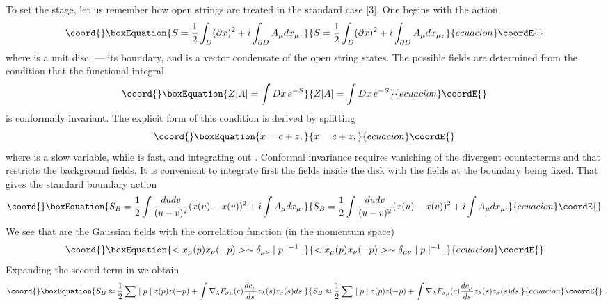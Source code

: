 \documentclass[a4paper,12pt]{article}
\begin{document}
To set the stage, let us remember how open strings are treated in the
standard case [3]. One begins with the action 
\begin{equation}\coord{}\boxEquation{
S=\frac{1}{2}\int_{D}(\partial x)^{2}+i\int_{\partial D}A_{\mu }dx_{\mu },
}{
S=\frac{1}{2}\int_{D}(\partial x)^{2}+i\int_{\partial D}A_{\mu }dx_{\mu },
}{ecuacion}\coordE{}\end{equation}
where \coordHE{} is a unit disc, \coordHE{} --- its boundary, and \coordHE{} is a
vector condensate of the open string states. The possible fields \coordHE{}
are determined from the condition that the functional integral 
\begin{equation}\coord{}\boxEquation{
Z[A]=\int Dx\,e^{-S}
}{
Z[A]=\int Dx\,e^{-S}
}{ecuacion}\coordE{}\end{equation}
is conformally invariant. The explicit form of this condition is derived by
splitting 
\begin{equation}\coord{}\boxEquation{
x=c+z,
}{
x=c+z,
}{ecuacion}\coordE{}\end{equation}
where \coordHE{} is a slow variable, while \coordHE{} is fast, and integrating out \coordHE{}.
Conformal invariance requires vanishing of the divergent counterterms and
that restricts the background fields. It is convenient to integrate first
the fields inside the disk with the fields at the boundary being fixed. That
gives the standard boundary action 
\begin{equation}\coord{}\boxEquation{
S_{B}=\frac{1}{2}\int \frac{dudv}{(u-v)^{2}}(x(u)-x(v))^{2}+i\int A_{\mu
}dx_{\mu }.
}{
S_{B}=\frac{1}{2}\int \frac{dudv}{(u-v)^{2}}(x(u)-x(v))^{2}+i\int A_{\mu
}dx_{\mu }.
}{ecuacion}\coordE{}\end{equation}
We see that \coordHE{} are the Gaussian fields with the correlation
function (in the momentum space) 
\begin{equation}\coord{}\boxEquation{
<x_{\mu }(p)x_{\nu }(-p)>\sim \delta _{\mu \nu }\mid p\mid ^{-1}.
}{
<x_{\mu }(p)x_{\nu }(-p)>\sim \delta _{\mu \nu }\mid p\mid ^{-1}.
}{ecuacion}\coordE{}\end{equation}
Expanding the second term in \coordHE{} we obtain 
\begin{equation}\coord{}\boxEquation{
S_{B}\approx \frac{1}{2}\sum \mid p\mid z(p)z(-p)+\int \nabla _{\lambda
}F_{\sigma \mu }(c)\frac{dc_{\mu }}{ds}z_{\lambda }(s)z_{\sigma }(s)ds.
}{
S_{B}\approx \frac{1}{2}\sum \mid p\mid z(p)z(-p)+\int \nabla _{\lambda
}F_{\sigma \mu }(c)\frac{dc_{\mu }}{ds}z_{\lambda }(s)z_{\sigma }(s)ds.
}{ecuacion}\coordE{}\end{equation}
\end{document}
